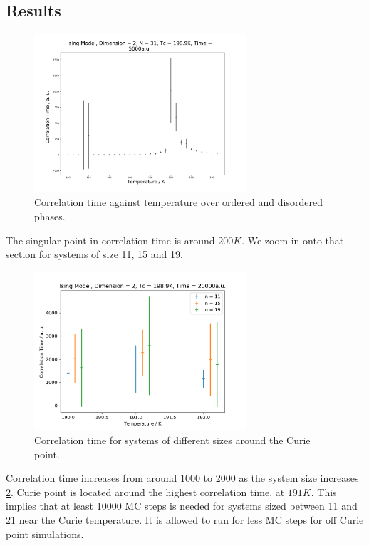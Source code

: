 \documentclass[%
showkeys,
bibnotes,
amsmath,amssymb,
floatfix,
]{revtex4-1}
\begin{document}
\subsection{\label{sec:level2}Results}

\begin{figure}[H] \centering
	\includegraphics[width=0.7\textwidth]{../figures/auto_corre_scan}
	\caption{\label{fig:auto_corre_scan} Correlation time against temperature over ordered and disordered phases.}
\end{figure}

The singular point in correlation time is around $200K$. We zoom in onto that section for systems of size 11, 15 and 19.

\begin{figure}[H] \centering
	\includegraphics[width=0.7\textwidth]{../figures/mag_mag_different_size}
	\caption{\label{fig:mag_mag_different_size} Correlation time for systems of different sizes around the Curie point.}
\end{figure}

Correlation time increases from around 1000 to 2000 as the system size increases \ref{fig:mag_mag_different_size}. Curie point is located around the highest correlation time, at $191K$. This implies that at least 10000 MC steps is needed for systems sized between 11 and 21 near the Curie temperature. It is allowed to run for less MC steps for off Curie point simulations. 
\end{document}
